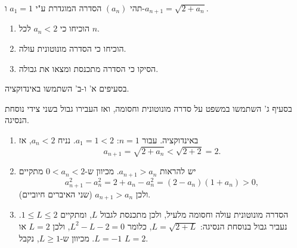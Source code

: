 
\begin{question}
תהי $(a_n)$ הסדרה המוגדרת ע"י $a_1 = 1$ ו-$a_{n+1} = \sqrt{2 + a_n}$.
\begin{enumerate}
  \item הוכיחו כי $a_n < 2$ לכל $n$.
  \item הוכיחו כי הסדרה מונוטונית עולה.
  \item הסיקו כי הסדרה מתכנסת ומצאו את גבולה.
\end{enumerate}
\end{question}

\begin{hint}
בסעיפים א' ו-ב' השתמשו באינדוקציה.
\end{hint}

\begin{hint}
בסעיף ג' השתמשו במשפט על סדרה מונוטונית וחסומה, ואז העבירו גבול בשני צידי נוסחת הנסיגה.
\end{hint}

\begin{solution}
\begin{enumerate}
  \item באינדוקציה. עבור $n=1$: $a_1 = 1 < 2$. נניח $a_n < 2$, אז
  \[ a_{n+1} = \sqrt{2 + a_n} < \sqrt{2 + 2} = 2. \]
  \item יש להראות $a_{n+1} > a_n$. מכיוון ש-$0 < a_n < 2$ מתקיים
  \[ a_{n+1}^2 - a_n^2 = 2 + a_n - a_n^2 = (2 - a_n)(1 + a_n) > 0, \]
  ולכן $a_{n+1} > a_n$ (שני האיברים חיוביים).
  \item הסדרה מונוטונית עולה וחסומה מלעיל, ולכן מתכנסת לגבול $L$, ומתקיים $1 \le L \le 2$.
  נעביר גבול בנוסחת הנסיגה: $L = \sqrt{2 + L}$, כלומר $L^2 - L - 2 = 0$, ולכן $L = 2$ או $L = -1$.
  מכיוון ש-$L \ge 1$, נקבל $\boxed{L = 2}$.
\end{enumerate}
\end{solution}
